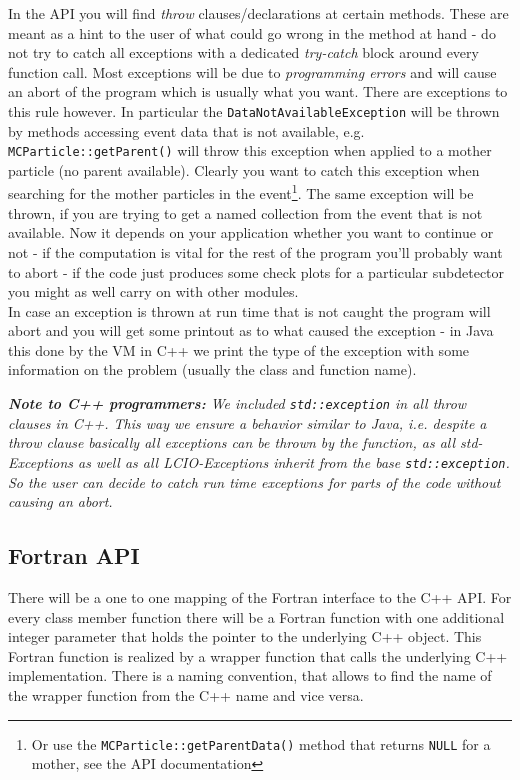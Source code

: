 \documentclass[twoside]{article}
\begin{document}
In the API you will find {\em throw} clauses/declarations at certain methods. These are meant as a hint
to the user of what could go wrong in the method at hand - do not try to catch all exceptions with a 
dedicated {\em try-catch} block around every function call. Most exceptions will be due to 
{\em programming errors} and will cause an abort of the program which is usually what you want.
There are exceptions to this rule however. In particular the \verb$DataNotAvailableException$ will be
thrown by methods accessing event data that is not available, e.g. \verb$MCParticle::getParent()$ will 
throw this exception when applied to a mother particle (no parent available). Clearly you want to catch 
this exception when searching for the mother particles in the event\footnote{Or use the 
{\tt MCParticle::getParentData()} method that returns {\tt NULL} for a mother, see  the API 
documentation}.
The same exception will be thrown, if you are trying to get a named collection from the event that 
is not available. Now it depends on your application whether you want to continue or not - if the 
computation is vital for the rest of the program you'll probably want to abort - if the code just
produces some check plots for a particular subdetector you might as well carry on with other 
modules.\\
In case an exception is thrown at run time that is not caught the program will abort and you will get 
some printout as to what caused the exception - 
in Java this done by the VM in C++ we print the type of the exception with some information on the 
problem (usually the class and function name).

\vspace{\baselineskip}
{\it {\bf Note to C++ programmers:} We included \verb$std::exception$ in all {\em throw} clauses in 
C++. This way we ensure a behavior similar to Java, i.e. despite a {\em throw}
clause basically all exceptions can be thrown by the function, as all std-Exceptions 
as well as all LCIO-Exceptions inherit from the base \verb$std::exception$. So the user can decide to
catch {\em run time} exceptions for parts of the code without causing an abort. 
}



\subsection{Fortran API}
There will be a one to one mapping of the Fortran interface to the C++ API. For every class member 
function there will be a Fortran function with one additional integer parameter that holds the 
pointer to the underlying C++ object. This Fortran function is realized by a wrapper function 
that calls the underlying C++ implementation.
There is a naming convention, that allows to find the name of 
the wrapper function from the C++ name and vice versa. 
\end{document}
